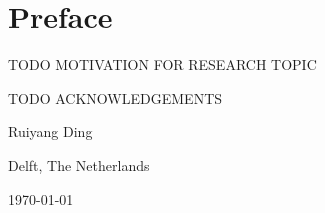 \chapter*{Preface}
TODO MOTIVATION FOR RESEARCH TOPIC

\vspace{1\baselineskip}

\noindent
TODO ACKNOWLEDGEMENTS

\vspace{1\baselineskip}

\noindent
Ruiyang Ding

\vspace{1\baselineskip}

\noindent
Delft, The Netherlands

\noindent
\today

